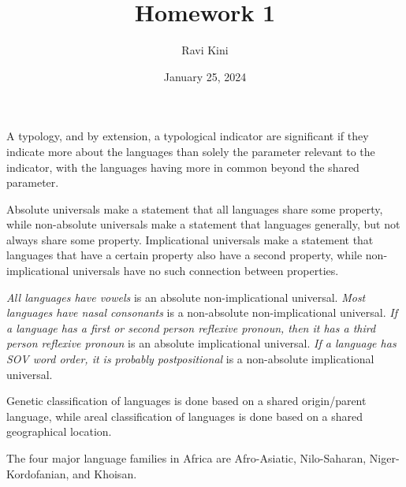 \documentclass{article}
\title{Homework 1}
\author{Ravi Kini}
\date{January 25, 2024}
\begin{document}
\maketitle

\problem
A typology, and by extension, a typological indicator are significant if they indicate more about the languages than solely the parameter relevant to the indicator, with the languages having more in common beyond the shared parameter.

\clearpage

\problem
Absolute universals make a statement that all languages share some property, while non-absolute universals make a statement that languages generally, but not always share some property. Implicational universals make a statement that languages that have a certain property also have a second property, while non-implicational universals have no such connection between properties.

\textit{All languages have vowels} is an absolute non-implicational universal. \textit{Most languages have nasal consonants} is a non-absolute non-implicational universal. \textit{If a language has a first or second person reflexive pronoun, then it has a third person reflexive pronoun} is an absolute implicational universal. \textit{If a language has SOV word order, it is probably postpositional} is a non-absolute implicational universal.

\clearpage

\problem
Genetic classification of languages is done based on a shared origin/parent language, while areal classification of languages is done based on a shared geographical location.

\clearpage

\problem
The four major language families in Africa are Afro-Asiatic, Nilo-Saharan, Niger-Kordofanian, and Khoisan.

\clearpage
\end{document}
